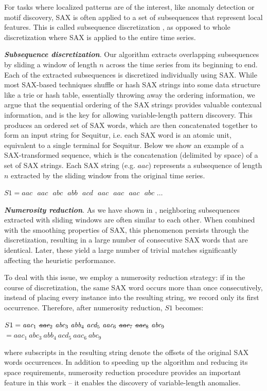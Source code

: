 \documentclass{llncs}
\newcommand{\msout}[1]{\text{\sout{\ensuremath{#1}}}}
\begin{document}
For tasks where localized patterns are of the interest, like anomaly detection or motif discovery, SAX is often applied to a set of subsequences that represent local features. This is called subsequence discretization \cite{lin_motifs}, as opposed to whole discretization where SAX is applied to the entire time series.

\textit{\textbf{Subsequence discretization}}. Our algorithm extracts overlapping subsequences by sliding a window of length $n$ across the time series from its beginning to end. Each of the extracted subsequences is discretized individually using SAX. While most SAX-based techniques shuffle or hash SAX strings into some data structure like a trie or hash table, essentially throwing away the ordering information, we argue that the sequential ordering of the SAX strings provides valuable contexual information, and is the key for allowing variable-length pattern discovery. This produces an ordered set of SAX words, which are then concatenated together to form an input string for Sequitur, i.e. each SAX word is an atomic unit, equivalent to a single terminal for Sequitur. Below we show an example of a SAX-transformed sequence, which is the concatenation (delimited by space) of a set of SAX strings. Each SAX string (e.g. $aac$) represents a subsequence of length $n$ extracted by the sliding window from the original time series.

\begin{center} 
$S1 = \textit{aac~ aac~ abc~ abb~ acd~ aac~ aac~ aac~ abc~} \dots$
\end{center}

\textit{\textbf{Numerosity reduction}}. As we have shown in \cite{lin_motifs}, neighboring subsequences extracted with sliding windows are often similar to each other. When combined with the smoothing properties of SAX, this phenomenon persists through the discretization, resulting in a large number of consecutive SAX words that are identical. Later, these yield a large number of trivial matches significantly affecting the heuristic performance. 

To deal with this issue, we employ a numerosity reduction strategy: if in the course of discretization, the same SAX word occurs more than once consecutively, instead of placing every instance into the resulting string, we record only its first occurrence. Therefore, after numerosity reduction, $S1$ becomes:
\begin{center}
 $S1 = \textit{aac}_{1}~ \msout{\textit{aac}}_{2}~ \textit{abc}_{3}~ \textit{abb}_{4}~ \textit{acd}_{5}~ \textit{aac}_{6}~ \msout{\textit{aac}}_{7}~ \msout{\textit{aac}}_{8}~ \textit{abc}_{9}$ \\
 $ = \textit{aac}_{1}~ \textit{abc}_{3}~ \textit{abb}_{4}~ \textit{acd}_{5}~ \textit{aac}_{6}~ \textit{abc}_{9}$ 
\end{center}
where subscripts in the resulting string denote the offsets of the original SAX words occurrences. In addition to speeding up the algorithm and reducing its space requirements, numerosity reduction procedure provides an important feature in this work -- it enables the discovery of variable-length anomalies. 
\end{document}
